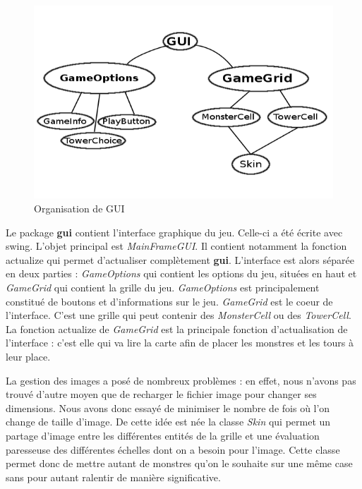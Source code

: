 \documentclass{article}
\begin{document}
\begin{figure}[h]
\center
\includegraphics[scale = 0.4]{schema_gui.png}
\caption{Organisation de GUI}
\end{figure}

Le package \textbf{gui} contient l'interface graphique du jeu. Celle-ci a été écrite avec swing. L'objet principal est \textit{MainFrameGUI}. Il contient notamment la fonction actualize qui permet d'actualiser complètement \textbf{gui}. L'interface est alors séparée en deux parties : \textit{GameOptions} qui contient les options du jeu, situées en haut et \textit{GameGrid} qui contient la grille du jeu. \textit{GameOptions} est principalement constitué de boutons et d'informations sur le jeu. \textit{GameGrid} est le coeur de l'interface. C'est une grille qui peut contenir des \textit{MonsterCell} ou des \textit{TowerCell}. La fonction actualize de \textit{GameGrid} est la principale fonction d'actualisation de l'interface : c'est elle qui va lire la carte afin de placer les monstres et les tours à leur place.
\par
La gestion des images a posé de nombreux problèmes : en effet, nous n'avons pas trouvé d'autre moyen que de recharger le fichier image pour changer ses dimensions. Nous avons donc essayé de minimiser le nombre de fois où l'on change de taille d'image. De cette idée est née la classe \textit{Skin} qui permet un partage d'image entre les différentes entités de la grille et une évaluation paresseuse des différentes échelles dont on a besoin pour l'image. Cette classe permet donc de mettre autant de monstres qu'on le souhaite sur une même case sans pour autant ralentir de manière significative.
\end{document}
